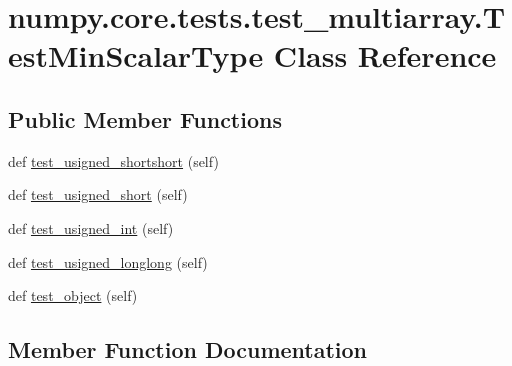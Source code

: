 \hypertarget{classnumpy_1_1core_1_1tests_1_1test__multiarray_1_1TestMinScalarType}{}\section{numpy.\+core.\+tests.\+test\+\_\+multiarray.\+Test\+Min\+Scalar\+Type Class Reference}
\label{classnumpy_1_1core_1_1tests_1_1test__multiarray_1_1TestMinScalarType}
\subsection*{Public Member Functions}
\begin{DoxyCompactItemize}
\item 
def \hyperlink{classnumpy_1_1core_1_1tests_1_1test__multiarray_1_1TestMinScalarType_a4dd47683138bf82871aad3e8c2f713d1}{test\+\_\+usigned\+\_\+shortshort} (self)
\item 
def \hyperlink{classnumpy_1_1core_1_1tests_1_1test__multiarray_1_1TestMinScalarType_ab052f4fbb9f49a9547b0329c09307124}{test\+\_\+usigned\+\_\+short} (self)
\item 
def \hyperlink{classnumpy_1_1core_1_1tests_1_1test__multiarray_1_1TestMinScalarType_a12d0313cba9e1bf10763f490ce7d3ef7}{test\+\_\+usigned\+\_\+int} (self)
\item 
def \hyperlink{classnumpy_1_1core_1_1tests_1_1test__multiarray_1_1TestMinScalarType_a228b44540ac9563ec4fe14e2104c9387}{test\+\_\+usigned\+\_\+longlong} (self)
\item 
def \hyperlink{classnumpy_1_1core_1_1tests_1_1test__multiarray_1_1TestMinScalarType_ae3dd7b62dd4885157ad766da44aba28b}{test\+\_\+object} (self)
\end{DoxyCompactItemize}


\subsection{Member Function Documentation}
\mbox{\label{classnumpy_1_1core_1_1tests_1_1test__multiarray_1_1TestMinScalarType_ae3dd7b62dd4885157ad766da44aba28b}} 
